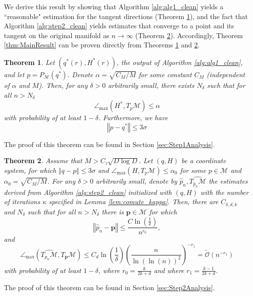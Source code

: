 \documentclass[12pt]{article}
\newtheorem{Theorem}{Theorem}[section]
\theoremstyle{remark}
\newcommand{\MM}{\mathcal{M}}
\newcommand{\norm}[1]{\left\Vert #1 \right\Vert}
\newcommand{\wtilde}[1]{\widetilde{#1}}
\newcommand{\maxangle}{\angle_{\max}}
\begin{document}
We derive this result by showing that Algorithm \ref{alg:alg1_clean} yields a ``reasonable" estimation for the tangent directions (Theorem \ref{thm:Step1}), and the fact that Algorithm \ref{alg:step2_clean} yields estimates that converge  to a point and its tangent on the original manifold as $n \to \infty$ (Theorem \ref{thm:Step2}). Accordingly, Theorem \ref{thm:MainResult} can be proven directly from Theorems \ref{thm:Step1} and \ref{thm:Step2}.


\begin{Theorem}\label{thm:Step1}
	Let $ (q^*(r), H^*(r)) $, the output of Algorithm \ref{alg:alg1_clean}, and let $p = P_\MM(q^*)$. 
	Denote $\alpha = \sqrt{C_M/M}$ for some constant $C_M$ (independent of $\alpha$ and $M$).
	Then, for any $\delta>0$ arbitrarily small, there exists $ N_{\delta} $ such that for all $ n > N_{\delta} $ 
	\[\angle_{\max}(H^*, T_p\MM)\leq \alpha\]
	with probability of at least $ 1 - \delta $.
	Furthermore, we have
	\[
	\norm{p - q^*} \leq 3 \sigma
	\]
\end{Theorem}

The proof of this theorem can be found in Section \ref{sec:Step1Analysis}.
\begin{Theorem}\label{thm:Step2}
	Assume that $M>C_\tau\sqrt{D\log D}$.  
	Let $(q, H)$ be  a coordinate system, for which $\norm{q - p}\leq 3 \sigma$ and $ \maxangle (H, T_p\MM) \leq \alpha_0$ for some $p \in \MM$ and $\alpha_0 = \sqrt{C_M/M}$.
	For any $\delta>0$ arbitrarily small, denote by $ \hat p_n, \widehat{T_{\hat p_n}\MM} $ the estimates derived from Algorithm \ref{alg:step2_clean} initialized with $(q,H)$ with the number of iterations $\kappa$ specified in Lemma \ref{lem:comute_kappa}. Then, there are $ C_{\delta,d,k} $ and $ N_{\delta} $ such that for all $ n > N_{\delta}  $ there is $\mathbf{p}\in \MM$ for which 
	\begin{equation}\label{eq:thm3.3_p_bound}
	\norm{\hat p_n - \mathbf p} \leq \frac{C \ln\left(\frac{1}{\delta}\right)}{n^{r_0}}
	,\end{equation}
	and 
	\begin{equation}\label{eq:thm3.3_tangent_ang}
	\angle_{\max}(\widehat{T_{\hat p_n}\MM},T_{\mathbf p}\MM) \leq C_{d}\ln\left(\frac{1}{\delta}\right) \left(\frac{ n}{\ln\left(\ln(n) \right)^2}\right)^{-r_1} = \wtilde{\mathcal{O}}(n^{-r_1})    
	\end{equation}
	with probability of at least $ 1 - \delta $, where $ r_0 = \frac{k}{2k +d} $ and where $ r_1 = \frac{k-1}{2k +d} $.
\end{Theorem}
The proof of this theorem can be found in Section \ref{sec:Step2Analysis}.
\end{document}
